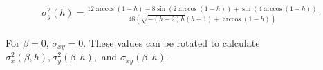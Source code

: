 \documentclass[conference]{IEEEtran}
\begin{document}
{\tiny
\begin{align}
\sigma_y^2(h)=
\frac{12 \arccos(1-h)-8 \sin \left(2 \arccos(1-h)\right)+\sin \left(4 \arccos(1-h)\right)}{48 \left(\sqrt{-(h-2) h} (h-1)+\arccos(1-h)\right)}
\end{align}}

For $\beta = 0$, $\sigma_{xy}=0$. These values can be rotated to calculate $\sigma_x^2(\beta,h),\sigma_y^2(\beta,h),$ and $\sigma_{xy}(\beta,h)$.

%




\end{document}

